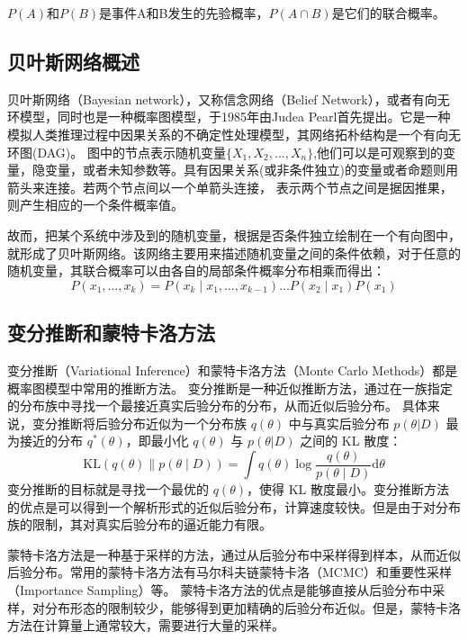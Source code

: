$P(A)$和$P(B)$是事件A和B发生的先验概率，${P(A \cap B)}$是它们的联合概率。

\subsection{贝叶斯网络概述}
贝叶斯网络（Bayesian network），又称信念网络（Belief Network），或者有向无环模型，同时也是一种概率图模型，于1985年由Judea Pearl\cite{pearl1985bayesian}首先提出。它是一种模拟人类推理过程中因果关系的不确定性处理模型，其网络拓朴结构是一个有向无环图(DAG)。
图中的节点表示随机变量$\{X_1,X_2,...,X_n\}$,他们可以是可观察到的变量，隐变量，或者未知参数等。具有因果关系(或非条件独立)的变量或者命题则用箭头来连接。若两个节点间以一个单箭头连接，
表示两个节点之间是据因推果，则产生相应的一个条件概率值。

故而，把某个系统中涉及到的随机变量，根据是否条件独立绘制在一个有向图中，就形成了贝叶斯网络。该网络主要用来描述随机变量之间的条件依赖，对于任意的随机变量，其联合概率可以由各自的局部条件概率分布相乘而得出：
$$
P\left(x_1, \ldots, x_k\right)=P\left(x_k \mid x_1, \ldots, x_{k-1}\right) \ldots P\left(x_2 \mid x_1\right) P\left(x_1\right)
$$




\subsection{变分推断和蒙特卡洛方法}
变分推断（Variational Inference）和蒙特卡洛方法（Monte Carlo Methods）都是概率图模型中常用的推断方法。
变分推断是一种近似推断方法\cite{jordan1999introduction}，通过在一族指定的分布族中寻找一个最接近真实后验分布的分布，从而近似后验分布。
具体来说，变分推断将后验分布近似为一个分布族 $q(\theta)$ 中与真实后验分布 $p(\theta|D)$ 最为接近的分布 $q^*(\theta)$，即最小化 $q(\theta)$ 与 $p(\theta|D)$ 之间的 KL 散度：
$$
\mathrm{KL}(q(\theta) \| p(\theta \mid D))=\int q(\theta) \log \frac{q(\theta)}{p(\theta \mid D)} \mathrm{d} \theta
$$
变分推断的目标就是寻找一个最优的 $q(\theta)$，使得 KL 散度最小。变分推断方法的优点是可以得到一个解析形式的近似后验分布，计算速度较快。但是由于对分布族的限制，其对真实后验分布的逼近能力有限。

蒙特卡洛方法\cite{metropolis1953equation}是一种基于采样的方法，通过从后验分布中采样得到样本，从而近似后验分布。常用的蒙特卡洛方法有马尔科夫链蒙特卡洛（MCMC）和重要性采样（Importance Sampling）等。
蒙特卡洛方法的优点是能够直接从后验分布中采样，对分布形态的限制较少，能够得到更加精确的后验分布近似。但是，蒙特卡洛方法在计算量上通常较大，需要进行大量的采样。